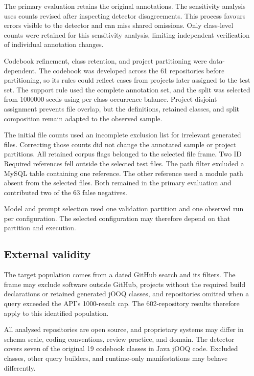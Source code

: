 The primary evaluation retains the original annotations. The sensitivity analysis uses counts revised after inspecting detector disagreements. This process favours errors visible to the detector and can miss shared omissions. Only class-level counts were retained for this sensitivity analysis, limiting independent verification of individual annotation changes.

Codebook refinement, class retention, and project partitioning were data-dependent. The codebook was developed across the \num{61} repositories before partitioning, so its rules could reflect cases from projects later assigned to the test set. The support rule used the complete annotation set, and the split was selected from \num{1000000} seeds using per-class occurrence balance. Project-disjoint assignment prevents file overlap, but the definitions, retained classes, and split composition remain adapted to the observed sample.

The initial file counts used an incomplete exclusion list for irrelevant generated files. Correcting those counts did not change the annotated sample or project partitions. All retained corpus flags belonged to the selected file frame. Two ID Required references fell outside the selected test files. The path filter excluded a MySQL table containing one reference. The other reference used a module path absent from the selected files. Both remained in the primary evaluation and contributed two of the \num{63} false negatives.

Model and prompt selection used one validation partition and one observed run per configuration. The selected configuration may therefore depend on that partition and execution.

\subsection{External validity}

The target population comes from a dated GitHub search and its filters. The frame may exclude software outside GitHub, projects without the required build declarations or retained generated jOOQ classes, and repositories omitted when a query exceeded the API's \num{1000}-result cap. The \num{602}-repository results therefore apply to this identified population.

All analysed repositories are open source, and proprietary systems may differ in schema scale, coding conventions, review practice, and domain. The detector covers seven of the original 19 codebook classes in Java jOOQ code. Excluded classes, other query builders, and runtime-only manifestations may behave differently.


